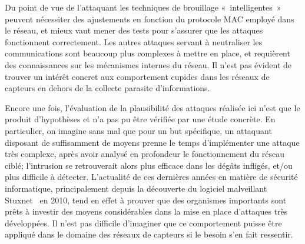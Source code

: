 Du point de vue de l'attaquant les techniques de brouillage « intelligentes » peuvent nécessiter des ajustements en fonction du protocole MAC employé dans le réseau, et mieux vaut mener des tests pour s'assurer que les attaques fonctionnent correctement.
Les autres attaques servant à neutraliser les communications sont beaucoup plus complexes à mettre en place, et requièrent des connaissances sur les mécanismes internes du réseau.
Il n'est pas évident de trouver un intérêt concret aux comportement cupides dans les réseaux de capteurs en dehors de la collecte parasite d'informations.

Encore une fois, l'évaluation de la plausibilité des attaques réalisée ici n'est que le produit d'hypothèses et n'a pas pu être vérifiée par une étude concrète.
En particulier, on imagine sans mal que pour un but spécifique, un attaquant disposant de suffisamment de moyens prenne le temps d'implémenter une attaque très complexe, après avoir analysé en profondeur le fonctionnement du réseau ciblé; l'intrusion se retrouverait alors plus efficace dans les dégâts infligés, et/ou plus difficile à détecter.
L'actualité de ces dernières années en matière de sécurité informatique, principalement depuis la découverte du logiciel malveillant Stuxnet~\cite{stuxnet} en 2010, tend en effet à prouver que des organismes importants sont prêts à investir des moyens considérables dans la mise en place d'attaques très développées.
Il n'est pas difficile d'imaginer que ce comportement puisse être appliqué dans le domaine des réseaux de capteurs si le besoin s'en fait ressentir.
